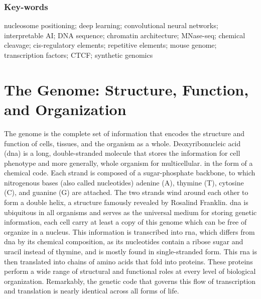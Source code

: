 \documentclass[11pt]{book}
\begin{document}
\subsection*{Key-words}
nucleosome positioning; deep learning; convolutional neural networks; interpretable AI; DNA sequence; chromatin architecture; MNase-seq; chemical cleavage; cis-regulatory elements; repetitive elements; mouse genome; transcription factors; CTCF; synthetic genomics

\tableofcontents
\newpage
\printglossary[type=acronym, title=List of Abbreviations, toctitle=List of Abbreviations]

\newpage

\newpage
\mainmatter
\chapter{The Genome: Structure, Function, and Organization}
The genome is the complete set of information that encodes the structure and function of cells, tissues, and the organism as a whole. Deoxyribonucleic acid (\gls{dna}) is a long, double-stranded molecule that stores the information for cell phenotype and more generally, whole organism for multicellular. in the form of a chemical code. Each strand is composed of a sugar-phosphate backbone, to which nitrogenous bases (also called nucleotides) adenine (A), thymine (T), cytosine (C), and guanine (G) are attached. The two strands wind around each other to form a double helix, a structure famously revealed by Rosalind Franklin\cite{franklinEvidence2ChainHelix1953}.
\gls{dna} is ubiquitous in all organisms and serves as the universal medium for storing genetic information, each cell carry at least a copy of this genome which can be free of organize in a nucleus. This information is transcribed into \gls{rna}, which differs from \gls{dna} by its chemical composition, as its nucleotides contain a ribose sugar and uracil instead of thymine, and is mostly found in single-stranded form. This \gls{rna} is then translated into chains of amino acids that fold into proteins. These proteins perform a wide range of structural and functional roles at every level of biological organization. Remarkably, the genetic code that governs this flow of transcription and translation is nearly identical across all forms of life\cite{kooninOriginEvolutionGenetic2009}.

\FloatBarrier
\end{document}
